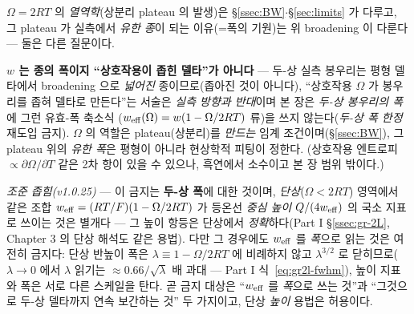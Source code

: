 $\Omega=2RT$ 의 \emph{열역학}(상분리 plateau 의 발생)은 \S\ref{ssec:BW}$\cdot$\S\ref{sec:limits} 가 다루고, 그
plateau 가 실측에서 \emph{유한 종}이 되는 이유(=폭의 기원)는 위 broadening 이 다룬다 --- 둘은 다른 질문이다.
\begin{warnbox}
\textbf{$w$ 는 종의 폭이지 ``상호작용이 좁힌 델타''가 아니다} --- 두-상 실측 봉우리는 평형 델타에서 broadening
으로 \emph{넓어진} 종이므로(좁아진 것이 아니다), ``상호작용 $\Omega$ 가 봉우리를 좁혀 델타로 만든다''는 서술은
\emph{실측 방향과 반대}이며 본 장은 \emph{두-상 봉우리의 폭}에 그런 유효-폭 축소식
($w_{\mathrm{eff}}(\Omega)=w(1-\Omega/2RT)$ 류)을 쓰지 않는다(\emph{두-상 폭 한정} 재도입 금지). $\Omega$ 의 역할은
plateau(상분리)를 \emph{만드는} 임계 조건이며(\S\ref{ssec:BW}), 그 plateau 위의 \emph{유한 폭}은 평형이 아니라
현상학적 피팅이 정한다. (상호작용 엔트로피 $\propto\partial\Omega/\partial T$ 같은 2차 항이 있을 수 있으나,
흑연에서 소수이고 본 장 범위 밖이다.)

\emph{조준 좁힘(v1.0.25)} --- 이 금지는 \textbf{두-상 폭}에 대한 것이며, \emph{단상}($\Omega<2RT$) 영역에서
같은 조합 $w_{\mathrm{eff}}=(RT/F)(1-\Omega/2RT)$ 가 등온선 \emph{중심 높이} $Q/(4w_{\mathrm{eff}})$ 의 국소 지표로 쓰이는 것은
별개다 --- 그 높이 항등은 단상에서 \emph{정확}하다(Part I \S\ref{ssec:gr-2L}, Chapter 3 의 단상 해석도 같은
용법). 다만 그 경우에도 $w_{\mathrm{eff}}$ 를 \emph{폭}으로 읽는 것은 여전히 금지다: 단상 반높이 폭은
$\lambda\equiv1-\Omega/2RT$ 에 비례하지 않고 $\lambda^{3/2}$ 로 닫히므로($\lambda\to0$ 에서 $\lambda$ 읽기는
$\approx0.66/\sqrt\lambda$ 배 과대 --- Part I 식~\eqref{eq:gr2l-fwhm}), 높이 지표와 폭은 서로 다른 스케일을
탄다. 곧 금지 대상은 ``$w_{\mathrm{eff}}$ 를 \emph{폭}으로 쓰는 것''과 ``그것으로 두-상 델타까지 연속 보간하는 것''
두 가지이고, 단상 \emph{높이} 용법은 허용이다.
\end{warnbox}

